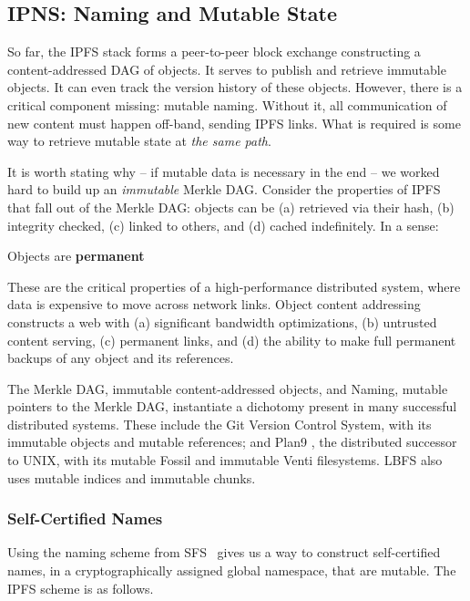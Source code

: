 \documentclass{sig-alternate}
\begin{document}
\subsection{IPNS: Naming and Mutable State}

So far, the IPFS stack forms a peer-to-peer block exchange constructing a content-addressed DAG of objects. It serves to publish and retrieve immutable objects. It can even track the version history of these objects. However, there is a critical component missing: mutable naming. Without it, all communication of new content must happen off-band, sending IPFS links. What is required is some way to retrieve mutable state at \textit{the same path}.

It is worth stating why -- if mutable data is necessary in the end -- we worked hard to build up an \textit{immutable} Merkle DAG. Consider the properties of IPFS that fall out of the Merkle DAG: objects can be (a) retrieved via their hash, (b) integrity checked, (c) linked to others, and (d) cached indefinitely. In a sense:

\begin{center}
  Objects are \textbf{permanent}
\end{center}

\noindent These are the critical properties of a high-performance distributed system, where data is expensive to move across network links. Object content addressing constructs a web with (a) significant bandwidth optimizations, (b) untrusted content serving, (c) permanent links, and (d) the ability to make full permanent backups of any object and its references.

The Merkle DAG, immutable content-addressed objects, and Naming, mutable pointers to the Merkle DAG, instantiate a dichotomy present in many successful distributed systems. These include the Git Version Control System, with its immutable objects and mutable references; and Plan9 \cite{Plan9}, the distributed successor to UNIX, with its mutable Fossil \cite{Fossil} and immutable Venti \cite{Venti} filesystems. LBFS \cite{LBFS} also uses mutable indices and immutable chunks.

\subsubsection{Self-Certified Names}

Using the naming scheme from SFS~\cite{mazieres98, mazieres00} gives us a way to construct self-certified names, in a cryptographically assigned global namespace, that are mutable. The IPFS scheme is as follows.
\end{document}
